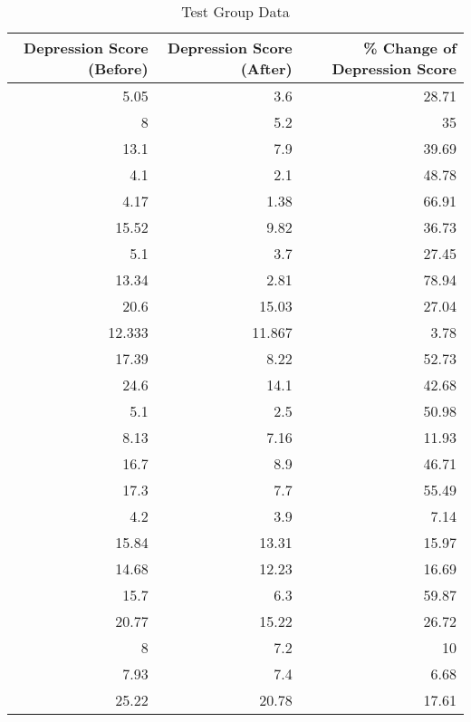\documentclass[12pt, titlepage]{article}
\begin{document}
 \begin{table}[hbt!]
    \small
    \caption{Test Group Data}
    \label{tab:1}
    \centering
  \begin{tabular}{rrr}
      \toprule
  Depression Score (Before) & Depression Score (After) & \% Change of Depression Score \\ 
    \midrule
     5.05 & 3.6 & 28.71\\ 
     8 & 5.2 & 35\\ 
     13.1 & 7.9 & 39.69\\ 
     4.1 & 2.1 & 48.78\\ 
     4.17 & 1.38 & 66.91\\ 
     15.52 & 9.82 & 36.73\\  
     5.1 & 3.7 & 27.45\\
     13.34 & 2.81 & 78.94\\
     20.6 & 15.03 & 27.04\\
     12.333 & 11.867 & 3.78\\
     17.39 & 8.22 & 52.73\\
     24.6 & 14.1 & 42.68\\
     5.1 & 2.5 & 50.98\\
     8.13 & 7.16 & 11.93\\
     16.7 & 8.9 & 46.71\\
     17.3 & 7.7 & 55.49\\
     4.2 & 3.9 & 7.14\\
     15.84 & 13.31 & 15.97\\
     14.68 & 12.23 & 16.69\\
     15.7 & 6.3 & 59.87\\
     20.77 & 15.22 & 26.72\\
     8 & 7.2 & 10\\
     7.93 & 7.4 & 6.68\\
     25.22 & 20.78 & 17.61\\
     \bottomrule
  \end{tabular}
  \end{table}
  
  \newpage
  
\end{document}
